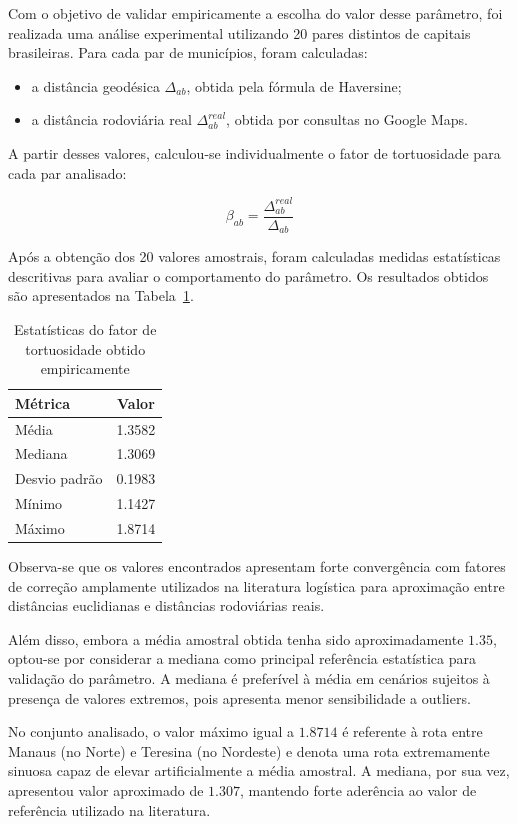 Com o objetivo de validar empiricamente a escolha do valor desse parâmetro, foi realizada uma análise experimental utilizando 20 pares distintos de capitais brasileiras. Para cada par de municípios, foram calculadas:
\begin{itemize}
    \item a distância geodésica $\Delta_{ab}$, obtida pela fórmula de Haversine;
    \item a distância rodoviária real $\Delta_{ab}^{real}$, obtida por consultas no Google Maps.
\end{itemize}

A partir desses valores, calculou-se individualmente o fator de tortuosidade para cada par analisado:

\[
\beta_{ab} = \frac{\Delta_{ab}^{real}}{\Delta_{ab}}
\]

Após a obtenção dos 20 valores amostrais, foram calculadas medidas estatísticas descritivas para avaliar o comportamento do parâmetro. Os resultados obtidos são apresentados na Tabela~\ref{tab:beta_estatisticas}.

\begin{table}[H]
\centering
\caption{Estatísticas do fator de tortuosidade obtido empiricamente}
\label{tab:beta_estatisticas}
\begin{tabular}{lc}
\hline
\textbf{Métrica} & \textbf{Valor} \\
\hline
Média & 1.3582 \\
Mediana & 1.3069 \\
Desvio padrão & 0.1983 \\
Mínimo & 1.1427 \\
Máximo & 1.8714 \\
\hline
\end{tabular}
\end{table}

Observa-se que os valores encontrados apresentam forte convergência com fatores de correção amplamente utilizados na literatura logística para aproximação entre distâncias euclidianas e distâncias rodoviárias reais.

Além disso, embora a média amostral obtida tenha sido aproximadamente $1.35$, optou-se por considerar a mediana como principal referência estatística para validação do parâmetro. A mediana é preferível à média em cenários sujeitos à presença de valores extremos, pois apresenta menor sensibilidade a outliers.

No conjunto analisado, o valor máximo igual a $1.8714$ é referente à rota entre Manaus (no Norte) e Teresina (no Nordeste) e denota uma rota extremamente sinuosa capaz de elevar artificialmente a média amostral. A mediana, por sua vez, apresentou valor aproximado de $1.307$, mantendo forte aderência ao valor de referência utilizado na literatura.

